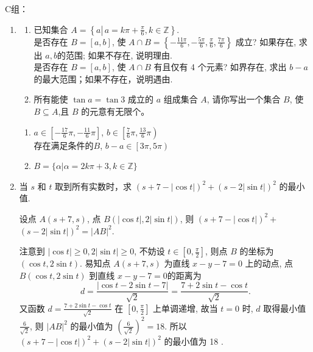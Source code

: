 C组：
\begin{enumerate}
\item
\begin{enumerate}
\item 已知集合 $A=\left\{a \left\lvert\, a=k \pi+\frac{\pi}{6}\right., k \in \mathbb{Z}\right\}$.\\
是否存在 $B=[a, b]$, 使 $A \cap B=\left\{-\frac{11 \pi}{6},-\frac{5 \pi}{6}, \frac{\pi}{6}, \frac{7 \pi}{6}\right\}$ 成立? 如果存在, 求出 $a, b$的范围; 如果不存在, 说明理由.\\
是否存在 $B=[a, b]$, 使 $A \cap B$ 有且仅有 4 个元素? 如界存在, 求出 $b-a$ 的最大范围；如果不存在，说明遇由.
\item 所有能使 $\tan a=\tan 3$ 成立的 $a$ 组成集合 $A$, 请你写出一个集合 $B$, 使 $B \subseteq A$,且 $B$ 的元意有无限个。
\end{enumerate}
\begin{jieda}
    \begin{enumerate}
        \item {}  $a \in\left[-\frac{17}{6} \pi,-\frac{11}{6} \pi\right]$, $b \in\left[\frac{7}{6} \pi, \frac{13}{6} \pi\right)$ \\
         存在满足条件的$B$, $b-a \in \left[3 \pi, 5 \pi\right)$
        \item $B=\{\alpha|\alpha=2k\pi+3,k\in\mathbb{Z}\}$
    \end{enumerate}
\end{jieda}

\item 当 $s$ 和 $t$ 取到所有实数时，求 $\left(s+7-|\cos t|\right)^2+\left(s-2|\sin t|\right)^2$ 的最小值.
\begin{jieda}
设点 $A\left(s+7, s\right)$, 点 $B\left(|\cos t|, 2|\sin t|\right)$, 则 $\left(s+7-|\cos t|\right)^2+$ $\left(s-2|\sin t|\right)^2=|A B|^2$.

注意到 $|\cos t| \geqslant 0,2|\sin t| \geqslant 0$, 不妨设 $t \in\left[0, \frac{\pi}{2}\right]$, 则点 $B$ 的坐标为 $\left(\cos t, 2 \sin t\right)$.
易知点 $A\left(s+7, s\right)$ 为直线 $x-y-7=0$ 上的动点, 点 $B\left(\cos t, 2 \sin t\right)$ 到直线 $x-y-7=0$的距离为
$$
d=\frac{|\cos t-2 \sin t-7|}{\sqrt{2}}=\frac{7+2 \sin t-\cos t}{\sqrt{2}} .
$$
又函数 $d=\frac{7+2 \sin t-\cos t}{\sqrt{2}}$ 在 $\left[0, \frac{\pi}{2}\right]$ 上单调递增, 故当 $t=0$ 时, $d$ 取得最小值 $\frac{6}{\sqrt{2}}$, 则 $|A B|^2$ 的最小值为 $\left(\frac{6}{\sqrt{2}}\right)^2=18$.
所以 $\left(s+7-|\cos t|\right)^2+\left(s-2|\sin t|\right)^2$ 的最小值为 18 .
\end{jieda}


\end{enumerate}
